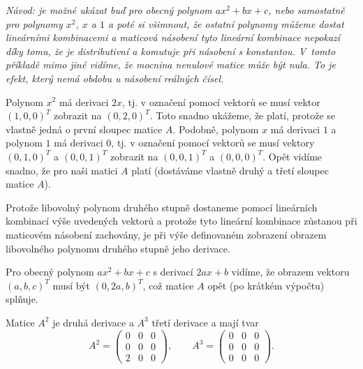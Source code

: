 \textit{Návod: je možné ukázat buď pro obecný polynom $ax^2+bx+c$, nebo samostatně pro polynomy  $x^2$, $x$ a $1$ a poté si všimnout, že ostatní polynomy můžeme dostat lineárními kombinacemi a maticová násobení tyto lineární kombinace nepokazí díky tomu, že je distributivní a komutuje při násobení s konstantou.
 V tomto příkladě mimo jiné vidíme, že mocnina nenulové matice může být nula. To je efekt, který nemá obdobu u násobení reálných čísel.}


\reseni Polynom $x^2$ má derivaci $2x$, tj. v označení pomocí vektorů
se musí vektor $(1,0,0)^T$ zobrazit na $(0,2,0)^T$. Toto snadno
ukážeme, že platí, protože se vlastně jedná o první sloupec matice
$A$. Podobně, polynom $x$ má derivaci $1$ a polynom $1$ má derivaci
$0$, tj. v označení pomocí vektorů se musí vektory $(0,1,0)^T$ a
$(0,0,1)^T$ zobrazit na $(0,0,1)^T$ a $(0,0,0)^T$. Opět vidíme snadno,
že pro naši matici $A$ platí (dostáváme vlastně druhý a třetí sloupec
matice $A$).

Protože libovolný polynom druhého stupně dostaneme pomocí lineárních
kombinací výše uvedených vektorů a protože tyto lineární kombinace
zůstanou při maticovém násobení zachovány, je při výše definovaném
zobrazení obrazem libovolného polynomu druhého stupně jeho derivace.

Pro obecný polynom $ax^2+bx+c$ s derivací $2ax+b$ vidíme, že obrazem
vektoru $(a,b,c)^T$ musí být $(0,2a, b)^T$, což matice $A$ opět (po
krátkém výpočtu) splňuje.

Matice $A^2$ je druhá derivace a $A^3$ třetí derivace a mají tvar
\begin{equation*}
  A^2=
  \begin{pmatrix}
  0 & 0 & 0 \\
  0 & 0 & 0 \\
  2 & 0 & 0
\end{pmatrix}, \qquad
  A^3=
  \begin{pmatrix}
  0 & 0 & 0 \\
  0 & 0 & 0 \\
  0 & 0 & 0
\end{pmatrix}.
\end{equation*}


\konec


\stranka

